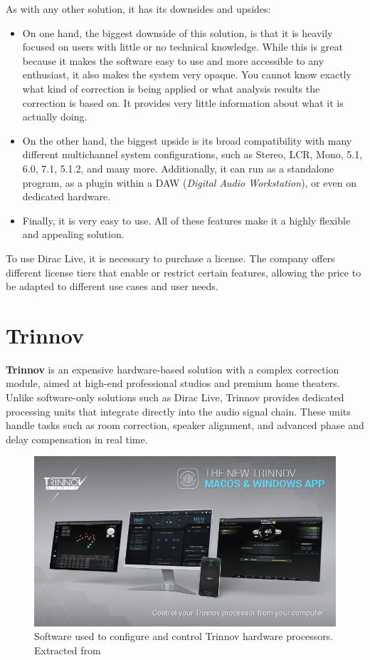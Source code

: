As with any other solution, it has its downsides and upsides:

\begin{itemize}
	\item On one hand, the biggest downside of this solution, is that it is heavily focused on users with little or no technical knowledge. While this is great because it makes the software easy to use and more accessible to any enthusiast, it also makes the system very opaque. You cannot know exactly what kind of correction is being applied or what analysis results the correction is based on. It provides very little information about what it is actually doing.
	
	\item On the other hand, the biggest upside is its broad compatibility with many different multichannel system configurations, such as Stereo, LCR, Mono, 5.1, 6.0, 7.1, 5.1.2, and many more. Additionally, it can run as a standalone program, as a plugin within a DAW (\textit{Digital Audio Workstation}), or even on dedicated hardware.
	
	\item Finally, it is very easy to use. All of these features make it a highly flexible and appealing solution.
\end{itemize}

To use Dirac Live, it is necessary to purchase a license. The company offers different license tiers that enable or restrict certain features, allowing the price to be adapted to different use cases and user needs.


\section{Trinnov}

\textbf{Trinnov}\cite{trinnov} is an expensive hardware-based solution with a complex correction module, aimed at high-end professional studios and premium home theaters. Unlike software-only solutions such as Dirac Live, Trinnov provides dedicated processing units that integrate directly into the audio signal chain. These units handle tasks such as room correction, speaker alignment, and advanced phase and delay compensation in real time.

\begin{figure}[H]
	\centering
	\includegraphics[width=0.9
	\linewidth]{Figures/trinnov_soft.png}
	\caption[Software used in the Trinnov system]{Software used to configure and control Trinnov hardware processors. Extracted from \cite{trinnov_image}}
	\label{fig:trinnov_soft}
\end{figure}

